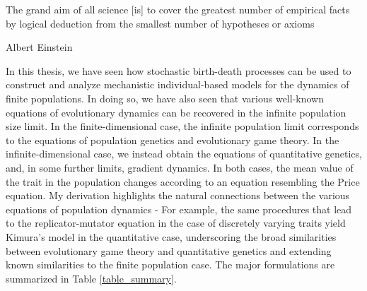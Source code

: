 \epigraph{\justifying The grand aim of all science [is] to cover the greatest number of empirical facts by logical deduction from the smallest number of hypotheses or axioms}{Albert Einstein}
\justifying
In this thesis, we have seen how stochastic birth-death processes can be used to construct and analyze mechanistic individual-based models for the dynamics of finite populations. In doing so, we have also seen that various well-known equations of evolutionary dynamics can be recovered in the infinite population size limit. In the finite-dimensional case, the infinite population limit corresponds to the equations of population genetics and evolutionary game theory. In the infinite-dimensional case, we instead obtain the equations of quantitative genetics, and, in some further limits, gradient dynamics. In both cases, the mean value of the trait in the population changes according to an equation resembling the Price equation. My derivation highlights the natural connections between the various equations of population dynamics - For example, the same procedures that lead to the replicator-mutator equation in the case of discretely varying traits yield Kimura's model in the quantitative case, underscoring the broad similarities between evolutionary game theory and quantitative genetics and extending known similarities to the finite population case. The major formulations are summarized in Table \ref{table_summary}.

